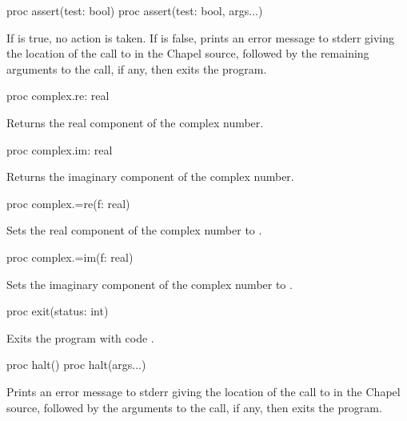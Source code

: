 \begin{protohead}
proc assert(test: bool)
proc assert(test: bool, args...)
\end{protohead}
\begin{protobody}
If  is true, no action is taken.
If  is false,
prints an error message to stderr giving the location of the call to 
in the Chapel source, followed by the remaining arguments to the call, if any,
then exits the program.
\end{protobody}

\begin{protohead}
proc complex.re: real
\end{protohead}
\begin{protobody}
Returns the real component of the complex number.
\end{protobody}

\begin{protohead}
proc complex.im: real
\end{protohead}
\begin{protobody}
Returns the imaginary component of the complex number.
\end{protobody}

\begin{protohead}
proc complex.=re(f: real)
\end{protohead}
\begin{protobody}
Sets the real component of the complex number to .
\end{protobody}

\begin{protohead}
proc complex.=im(f: real)
\end{protohead}
\begin{protobody}
Sets the imaginary component of the complex number to .
\end{protobody}

\begin{protohead}
proc exit(status: int)
\end{protohead}
\begin{protobody}
Exits the program with code .
\end{protobody}

\begin{protohead}
proc halt()
proc halt(args...)
\end{protohead}
\begin{protobody}
Prints an error message to stderr giving the location of the call to 
in the Chapel source, followed by the arguments to the call, if any,
then exits the program.
\end{protobody}

